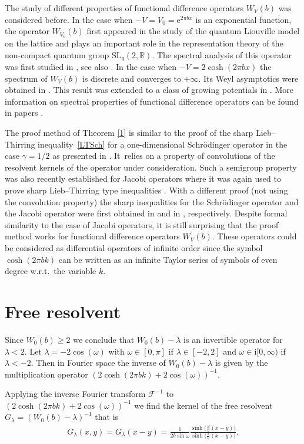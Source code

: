 \documentclass[pdftex]{sigma}%
\numberwithin{equation}{section}
\newcommand{\e}{\mathrm{e}}
\newcommand{\ii}{\mathrm{i}}
\newcommand{\R}{\mathbb{R}}
\begin{document}
The study of different properties of functional difference operators $W_V(b)$ was considered before.
In the case when $-V =V_0= \e^{2\pi b x}$ is an exponential function, the operator $W_{V_0}(b)$ first appeared in the study of the quantum Liouville model on the lattice \cite{FT1} and plays an important role in the representation theory of the non-compact quantum group $\mathrm{SL}_{q}(2,\R)$. The spectral analysis of this operator was first studied in \cite{K}, see also
\cite{FT2}.
In the case when $-V = 2\cosh (2\pi b x)$ the spectrum of $W_{V}(b)$ is discrete and converges to $+\infty$. Its Weyl asymptotics were obtained in \cite{LST1}. This result was extended to a class of growing potentials in \cite{LST2}. More information on spectral properties of functional difference operators can be found in papers \cite{GHM,GKMR,KM,KMZ, T}.

The proof method of Theorem \ref{1} is similar to the proof of the sharp Lieb--Thirring inequa\-lity~\eqref{LTSch} for a one-dimensional Schr\"odinger operator in the case $\gamma=1/2$ as presented in \cite{HLW}. It~relies on a property of convolutions of the resolvent kernels of the operator under consideration. Such a semigroup property was also recently established for Jacobi operators where it was again used to prove sharp Lieb--Thirring type inequalities \cite{LLS}. With a different proof (not using the convolution property) the sharp inequalities for the Schr\"odinger operator and the Jacobi operator were first obtained in \cite{HLT} and in \cite{HS}, respectively. Despite formal similarity to the case of Jacobi operators, it is still surprising that the proof method works for functional difference operators $W_V(b)$. These operators could be considered as differential operators of infinite order since the symbol $\cosh(2\pi b k)$ can be written as an infinite Taylor series of symbols of even degree w.r.t.\ the variable $k$.

\section{Free resolvent}

Since $W_0(b)\ge 2$ we conclude that $W_0(b)-\lambda$ is an invertible operator for $\lambda<2$. Let
$\lambda=-2\cos(\omega)$ with $\omega\in[0,\pi]$ if $\lambda\in[-2,2]$ and $\omega\in\ii[0,\infty)$ if $\lambda<-2$. Then in Fourier space the inverse of $W_0(b)-\lambda$ is given by the multiplication operator $(2\cosh(2\pi b k)+2\cos(\omega))^{-1}$.

Applying the inverse Fourier transform $\mathcal{F}^{-1}$ to $(2\cosh(2\pi b k)+2\cos(\omega))^{-1}$ we find the kernel of the free resolvent $G_\lambda=(W_0(b)-\lambda)^{-1}$ that is
\begin{gather}\label{rezolvent}
G_\lambda(x,y) = G_\lambda(x-y)=\frac{1}{2b\sin \omega} \frac{\sinh \big(\frac{\omega}{b} (x-y)\big)}{\sinh \big(\frac{\pi}{b} (x-y)\big)}.
\end{gather}
\end{document}
